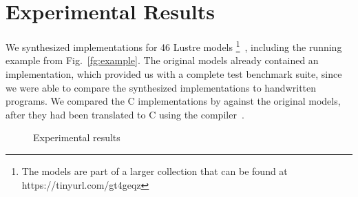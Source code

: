 \section{Experimental Results}
\label{sec:experiment}

We synthesized implementations for 46 Lustre models%
\footnote{The models are part of a larger collection
that can be found at
https://tinyurl.com/gt4geqz}~\cite{Hagen08:FMCAD}, including the running example from Fig.~\ref{fg:example}.
 The original models already contained an implementation,
which provided us with a complete test benchmark suite, since we were able to
compare the synthesized implementations to handwritten programs.
We compared the C implementations by \jkindsynt against the original models, after they had been translated
to C using the \lustrev compiler~\cite{lustrev6}.



\begin{figure}[h!]
	\centering
	\hspace{5mm}
	\hfill
	\caption{Experimental results}
	\label{fig:expfigs} 
\end{figure}


